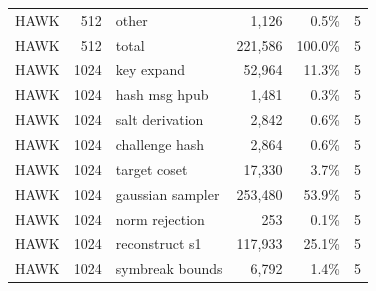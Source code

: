 \begin{table}[t]
{\begin{tabular}{lrlrrr}
HAWK & 512 & other & 1{,}126 & 0.5\% & 5 \\
HAWK & 512 & total & 221{,}586 & 100.0\% & 5 \\
HAWK & 1024 & key expand & 52{,}964 & 11.3\% & 5 \\
HAWK & 1024 & hash msg hpub & 1{,}481 & 0.3\% & 5 \\
HAWK & 1024 & salt derivation & 2{,}842 & 0.6\% & 5 \\
HAWK & 1024 & challenge hash & 2{,}864 & 0.6\% & 5 \\
HAWK & 1024 & target coset & 17{,}330 & 3.7\% & 5 \\
HAWK & 1024 & gaussian sampler & 253{,}480 & 53.9\% & 5 \\
HAWK & 1024 & norm rejection & 253 & 0.1\% & 5 \\
HAWK & 1024 & reconstruct s1 & 117{,}933 & 25.1\% & 5 \\
HAWK & 1024 & symbreak bounds & 6{,}792 & 1.4\% & 5 \\
\bottomrule
\end{tabular}}
\end{table}

